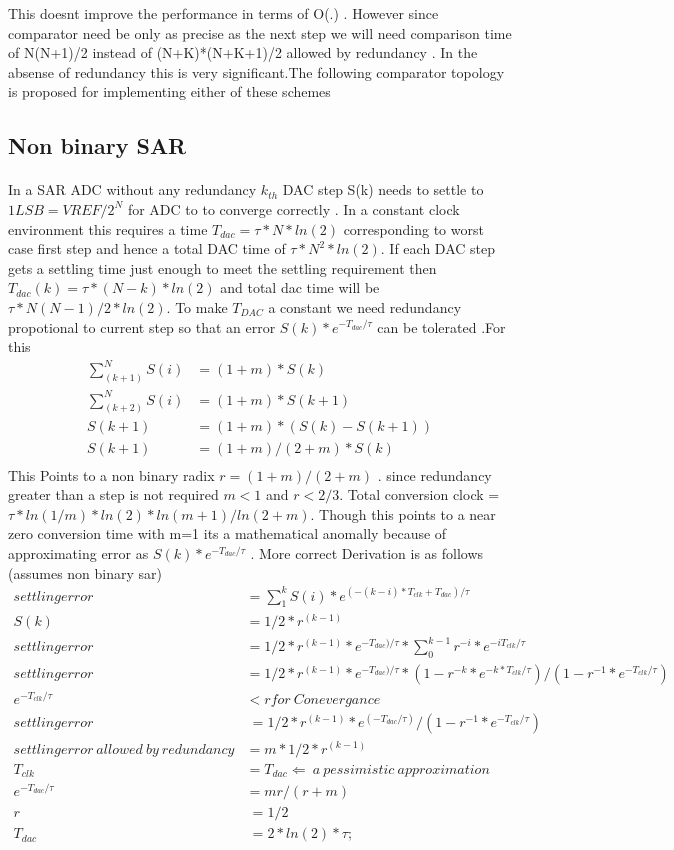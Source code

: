 \documentclass[a4paper,10pt,fleqn,titlepage,twoside]{article}
\begin{document}
This doesnt improve the performance in terms of O(.) . However since comparator need be only as precise as the next step we will need comparison time of N(N+1)/2 instead of (N+K)*(N+K+1)/2 allowed by redundancy .
In the absense of redundancy this is very significant.The following comparator topology is proposed for implementing either of these schemes
\newpage
\subsection*{Non binary SAR}
\paragraph{}
	In a SAR ADC without any redundancy $k_{th}$ DAC step S(k) needs to settle to $1LSB = VREF/2^{N}$ for ADC to 
to converge correctly . In a constant clock environment this requires a time $T_{dac}=\tau*N*ln(2)$ corresponding to worst case first step and hence a total
DAC time of $\tau*N^{2}*ln(2)$. If each DAC step gets a settling time just enough to meet the settling requirement then $T_{dac}(k)=\tau*(N-k)*ln(2)$ and total dac
time will be $\tau*N(N-1)/2*ln(2)$. To make $T_{DAC}$ a constant we need redundancy propotional to current step so that an error $S(k)*e^{-T_{dac}/\tau}$ can be tolerated
.For this 
\begin{align*}
\sum_{(k+1)}^N{S(i)} &= (1+m)*S(k)\\
\sum_{(k+2)}^N{S(i)} &= (1+m)*S(k+1)\\
S(k+1) &= (1+m)*(S(k)-S(k+1))\\
S(k+1) &= (1+m)/(2+m)*S(k)\\
\end{align*}
This Points to a non binary radix $r=(1+m)/(2+m)$ . since redundancy greater than a step is not required $m<1$ and $r<2/3$. Total conversion clock = $\tau*ln(1/m)*ln(2)*ln(m+1)/ln(2+m)$.
Though this points to a near zero conversion time with m=1 its a mathematical anomally because of approximating error as $S(k)*e^{-T_{dac}/\tau}$ . More correct Derivation
is as follows (assumes non binary sar)
\begin{align*}
settling error &= \sum_1^k{S(i)*e^{(-(k-i)*T_{clk}+T_{dac})/\tau}}\\
S(k)&=1/2*r^{(k-1)}\\
settling error &= 1/2*r^{(k-1)}*e^{-T_{dac})/\tau}*\sum_0^{k-1}{r^{-i}*e^{-iT_{clk}/\tau}}\\
settling error &= 1/2*r^{(k-1)}*e^{-T_{dac})/\tau}*(1-r^{-k}*e^{-k*T_{clk}/\tau})/(1-r^{-1}*e^{-T_{clk}/\tau})\\
e^{-T_{clk}/\tau} &< r for\:Conevergance\\
settling error &~= 1/2*r^{(k-1)}*e^{(-T_{dac}/\tau)}/(1-r^{-1}*e^{-T_{clk}/\tau})\\
settlingerror\:allowed\:by\:redundancy &= m*1/2*r^{(k-1)}\\
T_{clk}&=T_{dac}\Leftarrow\:a\:pessimistic\:approximation\:\\
e^{-T_{dac}/\tau} &= mr/(r+m)\\
r&~=1/2\\
T_{dac} &~= 2*ln(2)*\tau;
\end{align*}
\newpage
\end{document}
